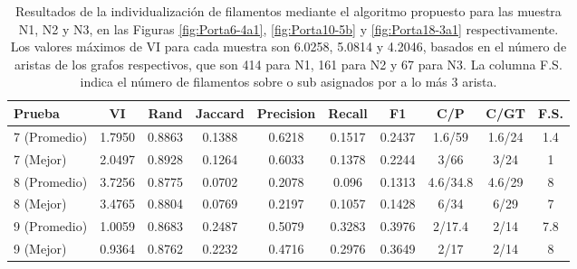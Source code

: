 \begin{table}[h]
    \centering
    \begin{tabular}{|l|c|c|c|c|c|c|c|c|c|}
    \hline
          Prueba & VI & Rand & Jaccard & Precision & Recall & F1 & C/P & C/GT & F.S. \\ \hline
         7 (Promedio) & 1.7950 & 0.8863 & 0.1388 & 0.6218 & 0.1517 & 0.2437 & 1.6/59 & 1.6/24 & 1.4\\
         7 (Mejor) & 2.0497 & 0.8928 & 0.1264 & 0.6033 & 0.1378 & 0.2244 & 3/66 & 3/24 & 1 \\
         8 (Promedio) & 3.7256 & 0.8775 & 0.0702 & 0.2078 & 0.096 & 0.1313 & 4.6/34.8 & 4.6/29 & 8\\
         8 (Mejor) & 3.4765 & 0.8804 & 0.0769 & 0.2197 & 0.1057 & 0.1428 & 6/34 & 6/29 & 7 \\
         9 (Promedio) & 1.0059 & 0.8683 & 0.2487 & 0.5079 & 0.3283 & 0.3976 & 2/17.4 & 2/14 & 7.8\\
         9 (Mejor) & 0.9364 & 0.8762 & 0.2232 & 0.4716 & 0.2976 & 0.3649 & 2/17 & 2/14 & 8 \\
         \hline
    \end{tabular}
    \caption{Resultados de la individualizaci\'on de filamentos mediante el algoritmo propuesto para las muestra N1, N2 y N3, en las Figuras \ref{fig:Porta6-4a1}, \ref{fig:Porta10-5b} y \ref{fig:Porta18-3a1} respectivamente. Los valores m\'aximos de VI para cada muestra son 6.0258, 5.0814 y 4.2046, basados en el n\'umero de aristas de los grafos respectivos, que son 414 para N1, 161 para N2 y 67 para N3. La columna F.S. indica el n\'umero de filamentos sobre o sub asignados por a lo m\'as 3 arista.}
    \label{tab:neuronResults}
\end{table}


